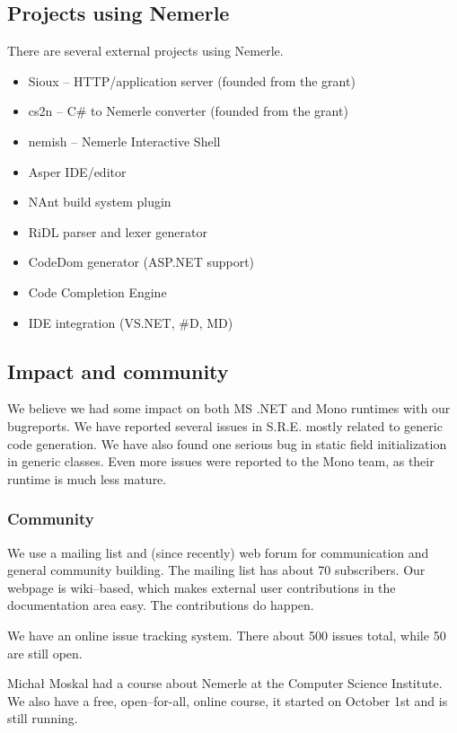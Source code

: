 \documentclass{article}
\begin{document}
\subsection{Projects using Nemerle}

There are several external projects using Nemerle.

\begin{itemize}
  \item Sioux -- HTTP/application server (founded from the grant)
  \item cs2n -- C\# to Nemerle converter (founded from the grant)
  \item nemish -- Nemerle Interactive Shell
  \item Asper IDE/editor
  \item NAnt build system plugin
  \item RiDL parser and lexer generator
  \item CodeDom generator (ASP.NET support)
  \item Code Completion Engine
  \item IDE integration (VS.NET, \#D, MD)
\end{itemize}


\subsection{Impact and community}

We believe we had some impact on both MS .NET and Mono runtimes
with our bugreports. We have reported several issues in S.R.E.
mostly related to generic code generation. We have also found one
serious bug in static field initialization in generic classes.
Even more issues were reported to the Mono team, as their
runtime is much less mature.

\subsubsection{Community}

We use a mailing list and (since recently) web forum for communication
and general community building. The mailing list has about 70 subscribers.
Our webpage is wiki--based, which makes external user contributions
in the documentation area easy. The contributions do happen.

We have an online issue tracking system. There about 500 issues
total, while 50 are still open.

Micha{\l} Moskal had a course about Nemerle at the Computer Science
Institute. We also have a free, open--for-all, online course,
it started on October 1st and is still running.
\end{document}
